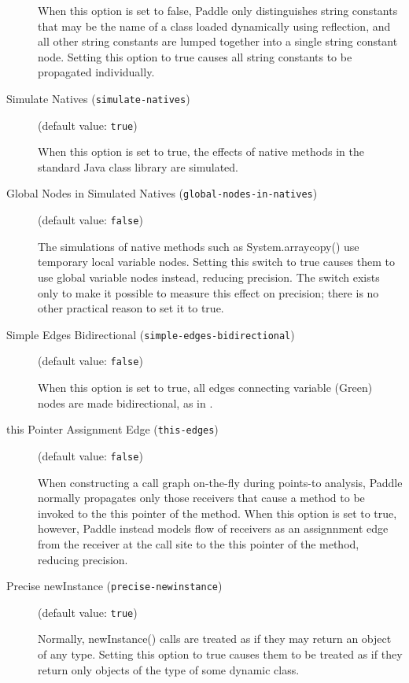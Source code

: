 \documentclass{article}
\begin{document}
\begin{description}
When this option is set to false, Paddle only distinguishes string constants that
may be the name of a class loaded dynamically using reflection, and all other
string constants are lumped together into a single string constant node.
Setting this option to true causes all string constants to be propagated
individually.
        


\item[Simulate Natives ({\tt simulate-natives})]
(default value: {\tt true})




When this option is set to true, the effects of native methods in the standard Java class library are simulated.
        


\item[Global Nodes in Simulated Natives ({\tt global-nodes-in-natives})]
(default value: {\tt false})




The simulations of native methods such as System.arraycopy() use
temporary local variable nodes. Setting this switch to true causes them
to use global variable nodes instead, reducing precision. The switch
exists only to make it possible to measure this effect on precision;
there is no other practical reason to set it to true.
        


\item[Simple Edges Bidirectional ({\tt simple-edges-bidirectional})]
(default value: {\tt false})




When this option is set to true, all edges connecting variable (Green)
nodes are made bidirectional, as in .
        


\item[this Pointer Assignment Edge ({\tt this-edges})]
(default value: {\tt false})




When constructing a call graph on-the-fly during points-to analysis, Paddle
normally propagates only those receivers that cause a method to be invoked
to the this pointer of the method. When this option is set to true, however,
Paddle instead models flow of receivers as an assignnment edge from the
receiver at the call site to the this pointer of the method, reducing
precision.
        


\item[Precise newInstance ({\tt precise-newinstance})]
(default value: {\tt true})




    Normally, newInstance() calls are treated as if they may return an object
    of any type. Setting this option to true causes them to be treated as if
    they return only objects of the type of some dynamic class.
            


\end{description}
\end{document}
